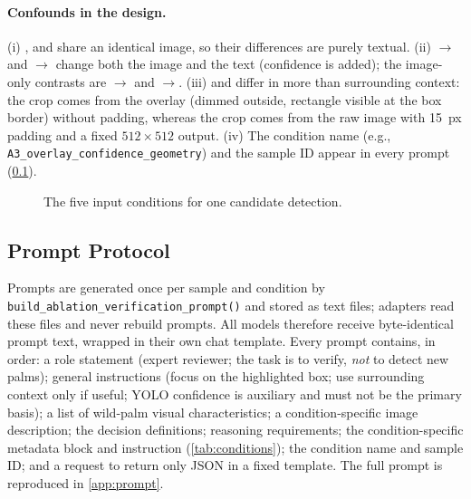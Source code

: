 \paragraph{Confounds in the design.} (i) ,  and 
share an identical image, so their differences are purely textual. (ii)
$\rightarrow$ and $\rightarrow$ change both
the image and the text (confidence is added); the image-only contrasts are
$\rightarrow$ and $\rightarrow$. (iii)
 and  differ in more than surrounding context: the 
crop comes from the overlay (dimmed outside, rectangle visible at the box
border) without padding, whereas the  crop comes from the raw image with
15~px padding and a fixed $512\times512$ output. (iv) The condition name (e.g.,
\texttt{A3\_overlay\_confidence\_geometry}) and the sample ID appear in every
prompt (\cref{sec:method:prompt}).

\begin{figure}[t]
  \centering
  \caption{The five input conditions for one candidate detection.}
  \label{fig:conditions}
\end{figure}

\subsection{Prompt Protocol}
\label{sec:method:prompt}
Prompts are generated once per sample and condition by
\texttt{build\_ablation\_verification\_prompt()} and stored as text files;
adapters read these files and never rebuild prompts. All models therefore
receive byte-identical prompt text, wrapped in their own chat template.
Every prompt contains, in order: a role statement (expert reviewer; the task is
to verify, \emph{not} to detect new palms); general instructions (focus on the
highlighted box; use surrounding context only if useful; YOLO confidence is
auxiliary and must not be the primary basis); a list of wild-palm visual
characteristics; a condition-specific image description; the decision
definitions; reasoning requirements; the condition-specific metadata block and
instruction (\cref{tab:conditions}); the condition name and sample ID; and a
request to return only JSON in a fixed template. The full  prompt is
reproduced in \cref{app:prompt}.

